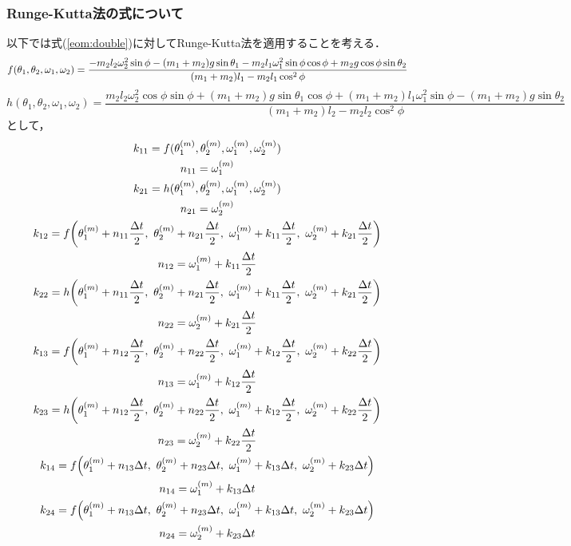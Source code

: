 \documentclass[a4paper,11pt]{jsarticle}
\begin{document}
\subsubsection{Runge-Kutta法の式について} \label{ch:RK42}
以下では式(\ref{eom:double})に対してRunge-Kutta法を適用することを考える．
\begin{equation}
  f(\theta_1, \theta_2, \omega_1, \omega_2) = \dfrac{-m_2l_2\omega_2^2\sin{\phi}-(m_1+m_2)g\sin{\theta_1}-m_2l_1\omega_1^2\sin{\phi}\cos{\phi}+m_2g\cos{\phi}\sin{\theta_2}}{(m_1+m_2)l_1-m_2l_1\cos^2{\phi}} \\
\end{equation}
\begin{equation}
  h(\theta_1, \theta_2, \omega_1, \omega_2) = \dfrac{m_2l_2\omega_2^2\cos{\phi}\sin{\phi}+(m_1+m_2)g\sin{\theta_1}\cos{\phi}+(m_1+m_2)l_1\omega_1^2\sin{\phi}-(m_1+m_2)g\sin{\theta_2}}{(m_1+m_2)l_2-m_2l_2\cos^2{\phi}}
\end{equation}
として，
\begin{gather}
  k_{11} = f(\theta_1^{(m)}, \theta_2^{(m)}, \omega_1^{(m)}, \omega_2^{(m)}) \\
  n_{11} = \omega_1^{(m)} \\
  k_{21} = h(\theta_1^{(m)}, \theta_2^{(m)}, \omega_1^{(m)}, \omega_2^{(m)}) \\
  n_{21} = \omega_2^{(m)} \\
  k_{12} = f\qty(\theta_1^{(m)}+n_{11}\dfrac{\Delta t}{2},\ \theta_2^{(m)}+n_{21}\dfrac{\Delta t}{2},\ \omega_1^{(m)}+k_{11}\dfrac{\Delta t}{2},\ \omega_2^{(m)}+k_{21}\dfrac{{\Delta t}}{2}) \\
  n_{12} = \omega_1^{(m)} + k_{11}\dfrac{\Delta t}{2} \\
  k_{22} = h\qty(\theta_1^{(m)}+n_{11}\dfrac{\Delta t}{2},\ \theta_2^{(m)}+n_{21}\dfrac{\Delta t}{2},\ \omega_1^{(m)}+k_{11}\dfrac{\Delta t}{2},\ \omega_2^{(m)}+k_{21}\dfrac{{\Delta t}}{2}) \\
  n_{22} = \omega_2^{(m)} + k_{21}\dfrac{\Delta t}{2} \\
  k_{13} = f\qty(\theta_1^{(m)}+n_{12}\dfrac{\Delta t}{2},\ \theta_2^{(m)}+n_{22}\dfrac{\Delta t}{2},\ \omega_1^{(m)}+k_{12}\dfrac{\Delta t}{2},\ \omega_2^{(m)}+k_{22}\dfrac{{\Delta t}}{2}) \\
  n_{13} = \omega_1^{(m)} + k_{12}\dfrac{\Delta t}{2} \\
  k_{23} = h\qty(\theta_1^{(m)}+n_{12}\dfrac{\Delta t}{2},\ \theta_2^{(m)}+n_{22}\dfrac{\Delta t}{2},\ \omega_1^{(m)}+k_{12}\dfrac{\Delta t}{2},\ \omega_2^{(m)}+k_{22}\dfrac{{\Delta t}}{2}) \\
  n_{23} = \omega_2^{(m)} + k_{22}\dfrac{\Delta t}{2} \\
  k_{14} = f\qty(\theta_1^{(m)}+n_{13}\Delta t,\ \theta_2^{(m)}+n_{23}\Delta t,\ \omega_1^{(m)}+k_{13}\Delta t,\ \omega_2^{(m)}+k_{23}\Delta t) \\
  n_{14} = \omega_1^{(m)} + k_{13}\Delta t \\
  k_{24} = f\qty(\theta_1^{(m)}+n_{13}\Delta t,\ \theta_2^{(m)}+n_{23}\Delta t,\ \omega_1^{(m)}+k_{13}\Delta t,\ \omega_2^{(m)}+k_{23}\Delta t) \\
  n_{24} = \omega_2^{(m)} + k_{23}\Delta t
\end{gather}
\end{document}
